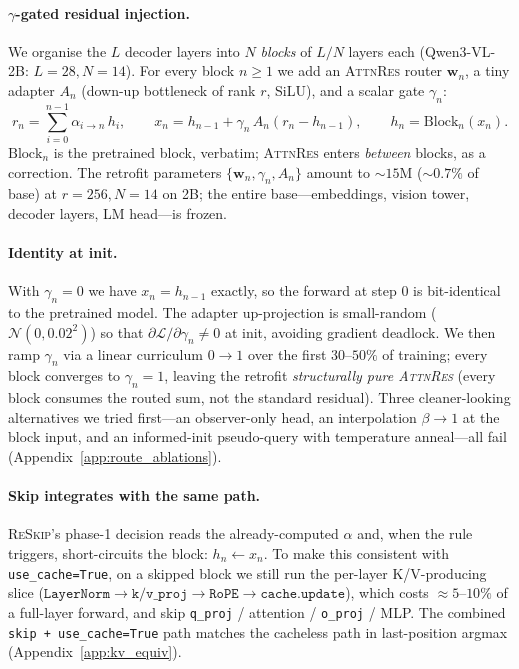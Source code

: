\documentclass{article}
\newcommand{\attnres}{\textsc{AttnRes}}
\newcommand{\reskip}{\textsc{ReSkip}}
\begin{document}
\paragraph{$\gamma$-gated residual injection.}
We organise the $L$ decoder layers into $N$ \emph{blocks} of $L/N$ layers each (Qwen3-VL-2B: $L{=}28, N{=}14$). For every block $n\ge 1$ we add an \attnres{} router $\mathbf{w}_n$, a tiny adapter $A_n$ (down-up bottleneck of rank $r$, SiLU), and a scalar gate $\gamma_n$:
\begin{equation}
  r_n = \sum_{i=0}^{n-1} \alpha_{i \to n}\,h_i, \qquad
  x_n = h_{n-1} + \gamma_n\,A_n(r_n - h_{n-1}), \qquad
  h_n = \mathrm{Block}_n(x_n).
  \label{eq:gamma_gate}
\end{equation}
$\mathrm{Block}_n$ is the pretrained block, verbatim; \attnres{} enters \emph{between} blocks, as a correction. The retrofit parameters $\{\mathbf{w}_n, \gamma_n, A_n\}$ amount to $\sim$$15$M ($\sim$$0.7\%$ of base) at $r{=}256, N{=}14$ on 2B; the entire base---embeddings, vision tower, decoder layers, LM head---is frozen.

\paragraph{Identity at init.}
With $\gamma_n{=}0$ we have $x_n = h_{n-1}$ exactly, so the forward at step $0$ is bit-identical to the pretrained model. The adapter up-projection is small-random ($\mathcal{N}(0,0.02^2)$) so that $\partial\mathcal{L}/\partial\gamma_n \ne 0$ at init, avoiding gradient deadlock. We then ramp $\gamma_n$ via a linear curriculum $0\to 1$ over the first $30$--$50\%$ of training; every block converges to $\gamma_n{=}1$, leaving the retrofit \emph{structurally pure \attnres{}} (every block consumes the routed sum, not the standard residual). Three cleaner-looking alternatives we tried first---an observer-only head, an interpolation $\beta\to 1$ at the block input, and an informed-init pseudo-query with temperature anneal---all fail (Appendix~\ref{app:route_ablations}).

\paragraph{Skip integrates with the same path.}
\reskip{}'s phase-1 decision reads the already-computed $\alpha$ and, when the rule triggers, short-circuits the block: $h_n\!\leftarrow\!x_n$. To make this consistent with \texttt{use\_cache=True}, on a skipped block we still run the per-layer K/V-producing slice ($\texttt{LayerNorm}\!\to\!\texttt{k/v\_proj}\!\to\!\texttt{RoPE}\!\to\!\texttt{cache.update}$), which costs ${\approx}5$--$10\%$ of a full-layer forward, and skip \texttt{q\_proj} / attention / \texttt{o\_proj} / MLP. The combined \texttt{skip\,+\,use\_cache=True} path matches the cacheless path in last-position argmax (Appendix~\ref{app:kv_equiv}).
\end{document}
